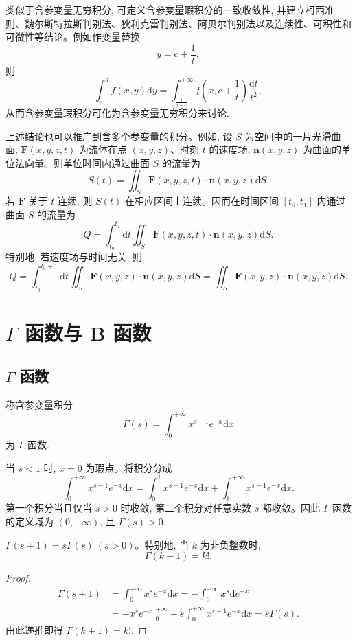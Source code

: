 类似于含参变量无穷积分, 可定义含参变量瑕积分的一致收敛性, 并建立柯西准则、魏尔斯特拉斯判别法、狄利克雷判别法、阿贝尔判别法以及连续性、可积性和可微性等结论。例如作变量替换
\[
  y=c+\frac1t,
\]
则
\[
  \int_c^d f(x,y)\mathrm dy
  =
  \int_{\frac1{d-c}}^{+\infty}
  f\left(x,c+\frac1t\right)\frac{\mathrm dt}{t^2},
\]
从而含参变量瑕积分可化为含参变量无穷积分来讨论.

上述结论也可以推广到含多个参变量的积分。例如, 设 $S$ 为空间中的一片光滑曲面, $\mathbf F(x,y,z,t)$ 为流体在点 $(x,y,z)$、时刻 $t$ 的速度场, $\mathbf n(x,y,z)$ 为曲面的单位法向量。则单位时间内通过曲面 $S$ 的流量为
\[
  S(t)=\iint_S \mathbf F(x,y,z,t)\cdot\mathbf n(x,y,z)\mathrm dS.
\]
若 $\mathbf F$ 关于 $t$ 连续, 则 $S(t)$ 在相应区间上连续。因而在时间区间 $[t_0,t_1]$ 内通过曲面 $S$ 的流量为
\[
  Q=\int_{t_0}^{t_1}\mathrm dt
  \iint_S \mathbf F(x,y,z,t)\cdot\mathbf n(x,y,z)\mathrm dS.
\]
特别地, 若速度场与时间无关, 则
\[
  Q=\int_{t_0}^{t_0+1}\mathrm dt
  \iint_S \mathbf F(x,y,z)\cdot\mathbf n(x,y,z)\mathrm dS
  =\iint_S \mathbf F(x,y,z)\cdot\mathbf n(x,y,z)\mathrm dS.
\]

\section{\texorpdfstring{$\Gamma$ 函数与 B 函数}{Γ 函数与 B 函数}}
\label{sec:ma-17-3}

\subsection{\texorpdfstring{$\Gamma$ 函数}{Γ 函数}}
\label{subsec:ma-17-3-1}

\begin{definition}\label{definition:ma-17-3-1}
称含参变量积分
\[
  \Gamma(s)=\int_0^{+\infty}x^{s-1}e^{-x}\mathrm dx
\]
为 $\Gamma$ 函数.
\end{definition}

当 $s<1$ 时, $x=0$ 为瑕点。将积分分成
\[
  \int_0^{+\infty}x^{s-1}e^{-x}\mathrm dx
  =
  \int_0^1x^{s-1}e^{-x}\mathrm dx+\int_1^{+\infty}x^{s-1}e^{-x}\mathrm dx.
\]
第一个积分当且仅当 $s>0$ 时收敛, 第二个积分对任意实数 $s$ 都收敛。因此 $\Gamma$ 函数的定义域为 $(0,+\infty)$, 且 $\Gamma(s)>0$.

\begin{property}\label{property:ma-17-3-1}
$\Gamma(s+1)=s\Gamma(s)\ (s>0)$。特别地, 当 $k$ 为非负整数时,
\[
  \Gamma(k+1)=k!.
\]
\end{property}


\begin{proof}
\[
\begin{aligned}
  \Gamma(s+1)
  &=\int_0^{+\infty}x^s e^{-x}\mathrm dx
  =-\int_0^{+\infty}x^s\mathrm d e^{-x}\\
  &=-x^s e^{-x}\Big|_0^{+\infty}
  +s\int_0^{+\infty}x^{s-1}e^{-x}\mathrm dx
  =s\Gamma(s).
\end{aligned}
\]
由此递推即得 $\Gamma(k+1)=k!$.
\end{proof}


